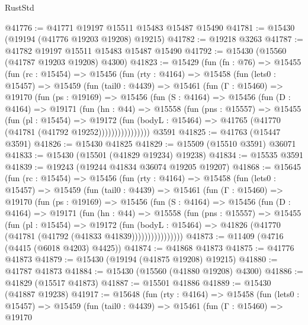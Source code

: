 \begin{lexlean}{RustStd}
\begin{coremodule}
{\begin{coremodule}
{{{{{{{{{{{{{{{{{{{{{{{{{{{{{{{{{{{{{{{{{{{{{{{{{{{{{{{{{{{{@41776 := @41771 @19197 @15511 @15483 @15487 @15490
@41781 := @15430 (@19194 (@41776 @19203 @19208) @19215)
@41782 := @19218 @3263
@41787 := @41782 @19197 @15511 @15483 @15487 @15490
@41792 := @15430 (@15560 (@41787 @19203 @19208) @4300)
@41823 := @15429
    (fun (fn : @76) =>
    @15455
      (fun (rc : @15454) =>
      @15456
        (fun (rty : @4164) =>
        @15458
          (fun (lets0 : @15457) =>
          @15459
            (fun (tail0 : @4439) =>
            @15461
              (fun (Γ : @15460) =>
              @19170
                (fun (ps : @19169) =>
                @15456
                  (fun (S : @4164) =>
                  @15456
                    (fun (D : @4164) =>
                    @19171
                      (fun (hn : @44) =>
                      @15558
                        (fun (pns : @15557) =>
                        @15455
                          (fun (pl : @15454) =>
                          @19172
                            (fun (bodyL : @15464) =>
                            @41765 (@41770 (@41781 (@41792 @19252))))))))))))))))
    @3591
@41825 := @41763 (@15447 @3591)
@41826 := @15430 @41825
@41829 := @15509 (@15510 @3591) @36071
@41833 := @15430 (@15501 (@41829 @19234) @19238)
@41834 := @15535 @3591
@41839 := @19243 (@19244 @41834 @36074 @19205 @19207)
@41868 := @15645
    (fun (rc : @15454) =>
    @15456
      (fun (rty : @4164) =>
      @15458
        (fun (lets0 : @15457) =>
        @15459
          (fun (tail0 : @4439) =>
          @15461
            (fun (Γ : @15460) =>
            @19170
              (fun (ps : @19169) =>
              @15456
                (fun (S : @4164) =>
                @15456
                  (fun (D : @4164) =>
                  @19171
                    (fun (hn : @44) =>
                    @15558
                      (fun (pns : @15557) =>
                      @15455
                        (fun (pl : @15454) =>
                        @19172
                          (fun (bodyL : @15464) =>
                          @41826 (@41770 (@41781 (@41792 (@41833 @41839))))))))))))))))
@41873 := @11409 (@4716 (@4415 (@6018 @4203) @4425))
@41874 := @41868 @41873
@41875 := @41776 @41873
@41879 := @15430 (@19194 (@41875 @19208) @19215)
@41880 := @41787 @41873
@41884 := @15430 (@15560 (@41880 @19208) @4300)
@41886 := @41829 (@15517 @41873)
@41887 := @15501 @41886
@41889 := @15430 (@41887 @19238)
@41917 := @15648
    (fun (rty : @4164) =>
    @15458
      (fun (lets0 : @15457) =>
      @15459
        (fun (tail0 : @4439) =>
        @15461
          (fun (Γ : @15460) =>
          @19170
}}}}}}}}}}}}}}}}}}}}}}}}}}}}}}}}}}}}}}}}}}}}}}}}}}}}}}}}}}}}
\end{coremodule}}
\end{coremodule}
\end{lexlean}
